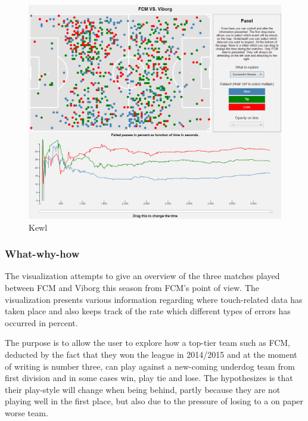 \documentclass[11pt]{article}
\begin{document}
 
\begin{figure}
	\center
	\includegraphics[scale=0.7]{test.png}
	\caption{Kewl}
	\label{Fig:}
\end{figure}


\subsubsection*{What-why-how}
The visualization attempts to give an overview of the three matches played between FCM and Viborg this season from FCM's point of view. The visualization presents various information regarding where touch-related data has taken place and also keeps track of the rate which different types of errors has occurred in percent.

The purpose is to allow the user to explore how a top-tier team such as FCM, deducted by the fact that they won the league in 2014/2015 and at the moment of writing is number three, can play against a new-coming underdog team from first division and in some cases win, play tie and lose. The hypothesizes is that their play-style will change when being behind, partly because they are not playing well in the first place, but also due to the pressure of losing to a on paper worse team.
\end{document}
